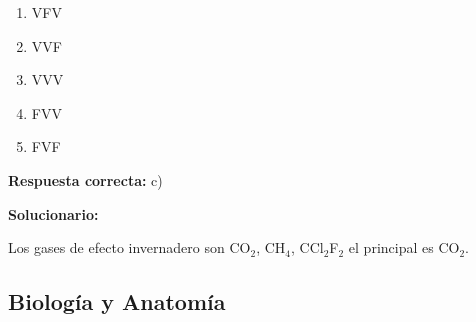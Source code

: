 \begin{enumerate}[resume]
	\begin{enumerate}[label=\alph*)]
		\item VFV
		\item VVF
		\item VVV
		\item FVV
		\item FVF
	\end{enumerate}

	\textbf{Respuesta correcta:} c)

	\vspace{2mm}
	\textbf{Solucionario:}


	Los gases de efecto invernadero son CO$_2$, CH$_4$, CCl$_2$F$_2$ el principal es CO$_2$.

	\vspace{6mm}


\end{enumerate}



\subsection*{Biología y Anatomía}

